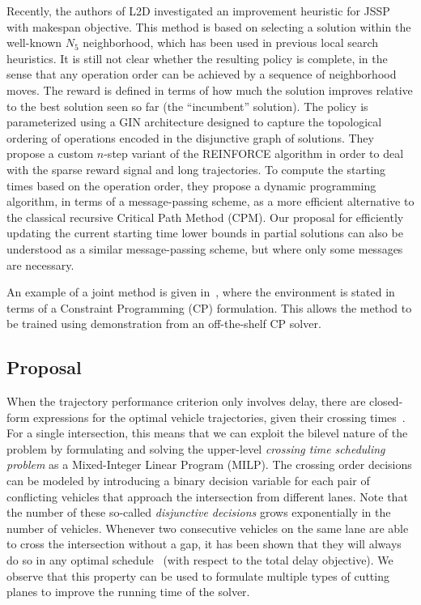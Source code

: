 \documentclass[a4paper]{article}
\theoremstyle{definition}
\theoremstyle{plain}
\begin{document}
Recently, the authors of L2D investigated an improvement heuristic for
JSSP~\cite{zhangDeepReinforcementLearning2024} with makespan objective.
%
This method is based on selecting a solution within the well-known $N_5$
neighborhood, which has been used in previous local search heuristics.
%
It is still not clear whether the resulting policy is complete, in the sense
that any operation order can be achieved by a sequence of neighborhood moves.
%
The reward is defined in terms of how much the solution improves relative to the
best solution seen so far (the ``incumbent'' solution). The policy is
parameterized using a GIN architecture designed to capture the topological
ordering of operations encoded in the disjunctive graph of solutions. They
propose a custom $n$-step variant of the REINFORCE algorithm in order to deal
with the sparse reward signal and long trajectories.
%
To compute the starting times based on the operation order, they propose a
dynamic programming algorithm, in terms of a message-passing scheme, as a more
efficient alternative to the classical recursive Critical Path Method (CPM).
%
Our proposal for efficiently updating the current starting time lower bounds in
partial solutions can also be understood as a similar message-passing scheme,
but where only some messages are necessary.

An example of a joint method is given in~\cite{tasselEndEndReinforcementLearning2023}, where the environment is stated in
terms of a Constraint Programming (CP) formulation. This allows the method to be
trained using demonstration from an off-the-shelf CP solver.


\subsection*{Proposal}


When the trajectory performance criterion only involves delay, there are
closed-form expressions for the optimal vehicle trajectories, given their
crossing times~\cite{timmermanPlatoonFormingAlgorithms2021}. For a single intersection, this means that we can exploit
the bilevel nature of the problem by formulating and solving the upper-level
\textit{crossing time scheduling problem} as a Mixed-Integer Linear Program
(MILP).
%
The crossing order decisions can be modeled by introducing a binary
decision variable for each pair of conflicting vehicles that approach the
intersection from different lanes. Note that the number of these so-called
\textit{disjunctive decisions} grows exponentially in the number of vehicles.
Whenever two consecutive vehicles on the same lane are able to cross the
intersection without a gap, it has been shown that they will always do so in any
optimal schedule~\cite{limpensOnlinePlatoonForming2023} (with respect to the
total delay objective). We observe that this property can be used to formulate
multiple types of cutting planes to improve the running time of the solver.
\end{document}
